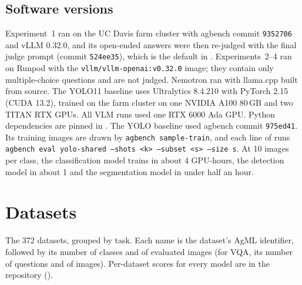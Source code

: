 \documentclass[10pt,letterpaper]{article}
\newcommand{\code}[1]{\texttt{#1}}
\begin{document}
\subsection{Software versions}
Experiment~1 ran on the UC Davis farm cluster with agbench commit \code{9352706} and vLLM 0.32.0, and its open-ended answers were then re-judged with the final judge prompt (commit \code{524ee35}), which is the default in . Experiments~2--4 ran on Runpod with the \code{vllm/vllm-openai:v0.32.0} image; they contain only multiple-choice questions and are not judged. Nemotron ran with llama.cpp built from source. The YOLO11 baseline uses Ultralytics 8.4.210 with PyTorch 2.15 (CUDA 13.2), trained on the farm cluster on one NVIDIA A100 80\,GB and two TITAN RTX GPUs. All VLM runs used one RTX 6000 Ada GPU. Python dependencies are pinned in . The YOLO baseline used agbench commit \code{975ed41}. Its training images are drawn by \code{agbench sample-train}, and each line of  runs \code{agbench eval yolo-shared --shots <k> --subset <s> --size s}. At 10 images per class, the classification model trains in about 4 GPU-hours, the detection model in about 1 and the segmentation model in under half an hour.

\section{Datasets}
\label{app:datasets}
The 372 datasets, grouped by task. Each name is the dataset's AgML identifier, followed by its number of classes and of evaluated images (for VQA, its number of questions and of images). Per-dataset scores for every model are in the repository ().

{\footnotesize

}
\end{document}
